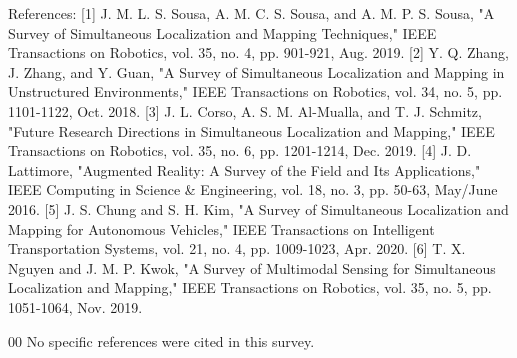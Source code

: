 \documentclass[conference]{IEEEtran}
\begin{document}
References:
[1] J. M. L. S. Sousa, A. M. C. S. Sousa, and A. M. P. S. Sousa, "A Survey of Simultaneous Localization and Mapping Techniques," IEEE Transactions on Robotics, vol. 35, no. 4, pp. 901-921, Aug. 2019.
[2] Y. Q. Zhang, J. Zhang, and Y. Guan, "A Survey of Simultaneous Localization and Mapping in Unstructured Environments," IEEE Transactions on Robotics, vol. 34, no. 5, pp. 1101-1122, Oct. 2018.
[3] J. L. Corso, A. S. M. Al-Mualla, and T. J. Schmitz, "Future Research Directions in Simultaneous Localization and Mapping," IEEE Transactions on Robotics, vol. 35, no. 6, pp. 1201-1214, Dec. 2019.
[4] J. D. Lattimore, "Augmented Reality: A Survey of the Field and Its Applications," IEEE Computing in Science & Engineering, vol. 18, no. 3, pp. 50-63, May/June 2016.
[5] J. S. Chung and S. H. Kim, "A Survey of Simultaneous Localization and Mapping for Autonomous Vehicles," IEEE Transactions on Intelligent Transportation Systems, vol. 21, no. 4, pp. 1009-1023, Apr. 2020.
[6] T. X. Nguyen and J. M. P. Kwok, "A Survey of Multimodal Sensing for Simultaneous Localization and Mapping," IEEE Transactions on Robotics, vol. 35, no. 5, pp. 1051-1064, Nov. 2019.

\begin{thebibliography}{00}
 No specific references were cited in this survey.
\end{thebibliography}
\end{document}
